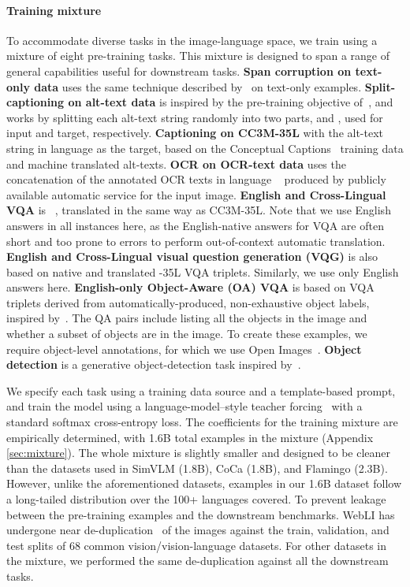 \documentclass{article}
\begin{document}
\paragraph{Training mixture}

To accommodate diverse tasks in the image-language space, we train \NAME using a mixture of eight pre-training tasks.
This mixture is designed to span a range of general capabilities useful for downstream tasks.
\textbf{Span corruption on text-only data} uses the same technique described by~\citet{xue-2021-mt5} on text-only examples. 
\textbf{Split-captioning on \PTDATA alt-text data} is inspired by the pre-training objective of~\citet{simvlm}, and works by splitting each alt-text string randomly into two parts, \capfirst and \capsecond, used for input and target, respectively. \textbf{Captioning on CC3M-35L} with the alt-text string in language \lang as the target, based on the Conceptual Captions~\citep{cc3m} training data and machine translated alt-texts. \textbf{OCR on \PTDATA OCR-text data} uses the concatenation of the annotated OCR texts in language \lang~\citep{prestu} produced by publicly available automatic service for the input image.  \textbf{English and Cross-Lingual VQA} is \qsqcc~\citep{changpinyo-2022-vq2a}, translated in the same way as CC3M-35L. Note that we use English answers in all instances here, as the English-native answers for VQA are often short and too prone to errors to perform out-of-context automatic translation. \textbf{English and Cross-Lingual visual question generation (VQG)} is also based on native and translated \qsqcc-35L VQA triplets.
Similarly, we use only English answers here. \textbf{English-only Object-Aware (OA) VQA} is based on VQA triplets derived from automatically-produced, non-exhaustive object labels, inspired by~\citet{piergiovanni-2022-OApretr}. The QA pairs include listing all the objects in the image and whether a subset of objects are in the image.
To create these examples, we require object-level annotations, for which we use Open Images~\citep{kuznetsova2020open}. \textbf{Object detection} is a generative object-detection task inspired by~\citet{Chen2022Pix2seqAL,chen2022unified}.

We specify each task using a training data source and a template-based prompt, and train the model using a language-model--style teacher forcing~\citep{goodfellow-2016-deep} with a standard softmax cross-entropy loss. The coefficients for the training mixture are empirically determined, with 1.6B total examples in the mixture (Appendix \ref{sec:mixture}). 
The whole mixture is slightly smaller and designed to be cleaner than the datasets used in SimVLM (1.8B), CoCa (1.8B), and Flamingo (2.3B).
However, unlike the aforementioned datasets, examples in our 1.6B dataset follow a long-tailed distribution over the 100+ languages covered. To prevent leakage between the pre-training examples and the downstream benchmarks. WebLI has undergone near de-duplication~\citep{align} of the images against the train, validation, and test splits of 68 common vision/vision-language datasets. For other datasets in the mixture, we performed the same de-duplication against all the downstream tasks.
\end{document}
